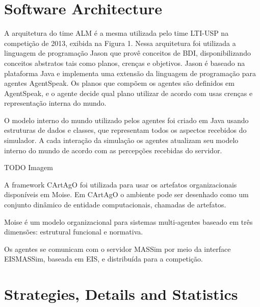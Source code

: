 \documentclass{llncs}
\begin{document}
\section{Software Architecture}

A arquitetura do time ALM é a mesma utilizada pelo time LTI-USP na competição de 2013, exibida na Figura 1. Nessa arquitetura foi utilizada a linguagem de programação Jason que provê conceitos de BDI, disponibilizando conceitos abstratos tais como planos, crenças e objetivos. Jason é baseado na plataforma Java e implementa uma extensão da linguagem de programação para agentes AgentSpeak. Os planos que compõem os agentes são definidos em AgentSpeak, e o agente decide qual plano utilizar de acordo com usas crenças e representação interna do mundo.

O modelo interno do mundo utilizado pelos agentes foi criado em Java usando estruturas de dados e classes, que representam todos os aspectos recebidos do simulador. A cada interação da simulação os agentes atualizam seu modelo interno do mundo de acordo com as percepções recebidas do servidor.

\color{red} TODO Imagem
\color{black}

A framework CArtAgO foi utilizada para usar os artefatos organizacionais disponíveis em Moise. Em CArtAgO o ambiente pode ser desenhado como um conjunto dinâmico de entidade computacionais, chamadas de artefatos.

Moise é um modelo organizacional para sistemas multi-agentes baseado em três dimensões: estrutural funcional e normativa.

Os agentes se comunicam com o servidor MASSim por meio da interface EISMASSim, baseada em EIS, e distribuída para a competição.

\section{Strategies, Details and Statistics}\label{sec:strategies}
\end{document}
